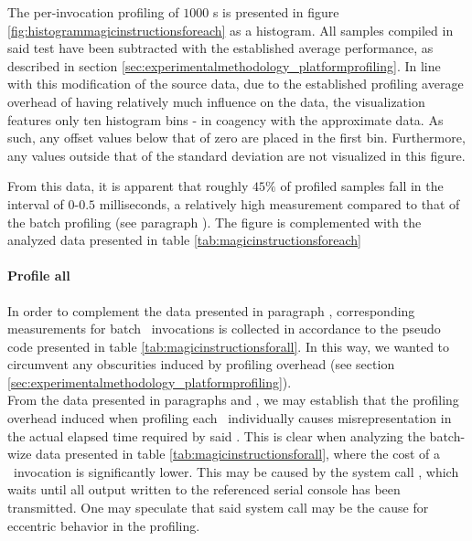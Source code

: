 

The per-invocation profiling of $1000$ \dvttermmagicinstruction s is presented in figure \ref{fig:histogrammagicinstructionsforeach} as a histogram.
All samples compiled in said test have been subtracted with the established average performance, as described in section \ref{sec:experimentalmethodology_platformprofiling}.
In line with this modification of the source data, due to the established profiling average overhead of  having relatively much influence on the data, the visualization features only ten histogram bins - in coagency with the approximate data.
As such, any offset values below that of zero are placed in the first bin.
Furthermore, any values outside that of the standard deviation are not visualized in this figure.



From this data, it is apparent that roughly $45\%$ of profiled samples fall in the interval of $0$-$0.5$ milliseconds, a relatively high measurement compared to that of the batch profiling (see paragraph ).
The figure is complemented with the analyzed data presented in table \ref{tab:magicinstructionsforeach}



\paragraph{Profile all}
\label{par:results_magicinstructionoverhead_profileall}
In order to complement the data presented in paragraph , corresponding measurements for batch \dvttermmagicinstruction\ invocations is collected in accordance to the pseudo code presented in table \ref{tab:magicinstructionsforall}.
In this way, we wanted to circumvent any obscurities induced by profiling overhead (see section \ref{sec:experimentalmethodology_platformprofiling}).\\



\noindent
From the data presented in paragraphs  and , we may establish that the profiling overhead induced when profiling each \dvttermmagicinstruction\ individually causes misrepresentation in the actual elapsed time required by said \dvttermmagicinstruction .
This is clear when analyzing the batch-wize data presented in table \ref{tab:magicinstructionsforall}, where the cost of a \dvttermmagicinstruction\ invocation is significantly lower.
This may be caused by the system call , which	waits until all output written to the referenced serial console has been transmitted.
One may speculate that said system call may be the cause for eccentric behavior in the profiling.

